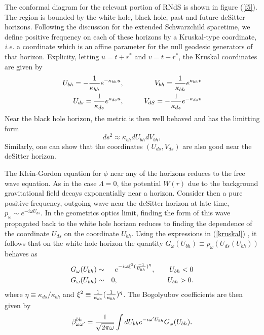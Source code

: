 \documentclass[12pt]{article}
\newcommand{\be}{\begin{equation}}
\newcommand{\ee}{\end{equation}}
\newcommand{\p}{\partial}
\def\bena{\begin{eqnarray}}
\def\eena{\end{eqnarray}}
\def\p{p_{\omega}}
\def\ubh{U_{bh}}
\def\uds{U_{ds}}
\def\vds{V_{ds}}
\def\kbh{\kappa_{bh}}
\def\kds{\kappa_{ds}}
\def\pw{p_\omega}
\def\bwwp{\beta_{\omega\omega^\prime}}
\def\bwwpbh{\bwwp^{bh}}
\begin{document}
The conformal diagram for the
relevant portion of RNdS is shown in figure (\ref{f5}). The region is bounded
by the white hole, black hole, past and future deSitter horizons.
Following the discussion for the extended Schwarzchild spacetime, we
define positive frequency on each of these horizons by a Kruskal-type
coordinate, {\it i.e.} a coordinate which is an affine parameter for the null
geodesic generators of that horizon.  Explicity, letting $u=t+r^*$ and
$v=t-r^*$, the
Kruskal coordinates are given by
%
\bena\label{kruskal}
\ubh =-{1\over {\kbh}}e^{-\kbh u}   ,&&\qquad V_{bh} ={1\over {\kbh}}
e^{\kbh v}\\
\uds={1\over \kds}e^{\kds u} ,&&\qquad V_{dS} =-{1\over \kds}e^{-\kds v} \eena
%
Near the black hole horizon, the metric is then well behaved and has the
limitting
form
%
\be\label{near}
ds^2 \approx \kbh d\ubh dV_{bh},\ee
%
Similarly, one can show that the coordinates $(\uds,\vds)$ are also good
near the deSitter horizon.

The Klein-Gordon equation for $\phi$ near any of the horizons reduces to
the free wave equation.  As in the case $\Lambda=0$,
the potential $W(r)$ due to the background gravitational field decays
exponentially near a horizon.  Consider then
a pure positive frequency, outgoing wave near the deSitter horizon
at late  time, $\p\sim e^{-i\omega \uds}$. In the geometrics optics
limit, finding the form of this wave
propagated back to the white hole horizon reduces to finding the
dependence of the coordinate $\uds$ on the coordinate $\ubh$.
Using the expressions in (\ref{kruskal}) , it follows that on the white
hole horizon
the quantity $G_{\omega}(\ubh )\equiv \pw (\uds (\ubh ))$ behaves as
%
\bena\label{whitehole}
G_{\omega}(\ubh )&\sim&
e^{-i\omega \xi ^2 ({-1\over \ubh})^{\eta}} ,\qquad
\ubh <0\\
G_{\omega}(\ubh )&\sim &0, \qquad\qquad\qquad\quad \ubh >0 .
\eena
%
where $\eta \equiv \kds /\kbh$ and $\xi ^2 \equiv {1\over \kds }
({1\over \kbh })^{\eta} $.
The Bogolyubov coefficients are then given by
\be\label{betabh}
\bwwpbh  = {1\over  \sqrt{2\pi\omega}}
\int d\ubh e^{-i\omega^\prime \ubh} G_{\omega} (\ubh )  .\ee
%
\end{document}
